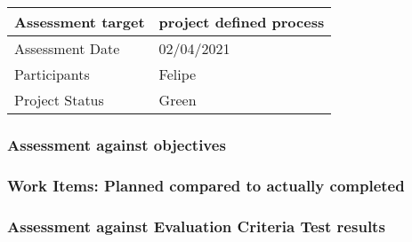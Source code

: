 
\noindent\begin{tabular}{|l|l|}
\hline
Assessment target & project defined process \\\hline
Assessment Date & 02/04/2021\\\hline
Participants & Felipe\\\hline
Project Status & Green\\\hline
\end{tabular}

\subsubsection*{Assessment against objectives}

\subsubsection*{Work Items: Planned compared to actually completed}

\subsubsection*{Assessment against Evaluation Criteria Test results}

